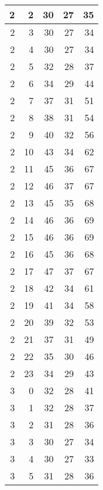\begin{longtable}{|r|r|r|r|r|}
    \hline
    2     & 2     & 30    & 27    & 35 \\
    \hline
    2     & 3     & 30    & 27    & 34 \\
    \hline
    2     & 4     & 30    & 27    & 34 \\
    \hline
    2     & 5     & 32    & 28    & 37 \\
    \hline
    2     & 6     & 34    & 29    & 44 \\
    \hline
    2     & 7     & 37    & 31    & 51 \\
    \hline
    2     & 8     & 38    & 31    & 54 \\
    \hline
    2     & 9     & 40    & 32    & 56 \\
    \hline
    2     & 10    & 43    & 34    & 62 \\
    \hline
    2     & 11    & 45    & 36    & 67 \\
    \hline
    2     & 12    & 46    & 37    & 67 \\
    \hline
    2     & 13    & 45    & 35    & 68 \\
    \hline
    2     & 14    & 46    & 36    & 69 \\
    \hline
    2     & 15    & 46    & 36    & 69 \\
    \hline
    2     & 16    & 45    & 36    & 68 \\
    \hline
    2     & 17    & 47    & 37    & 67 \\
    \hline
    2     & 18    & 42    & 34    & 61 \\
    \hline
    2     & 19    & 41    & 34    & 58 \\
    \hline
    2     & 20    & 39    & 32    & 53 \\
    \hline
    2     & 21    & 37    & 31    & 49 \\
    \hline
    2     & 22    & 35    & 30    & 46 \\
    \hline
    2     & 23    & 34    & 29    & 43 \\
    \hline
    3     & 0     & 32    & 28    & 41 \\
    \hline
    3     & 1     & 32    & 28    & 37 \\
    \hline
    3     & 2     & 31    & 28    & 36 \\
    \hline
    3     & 3     & 30    & 27    & 34 \\
    \hline
    3     & 4     & 30    & 27    & 33 \\
    \hline
    3     & 5     & 31    & 28    & 36 \\

\end{longtable}
